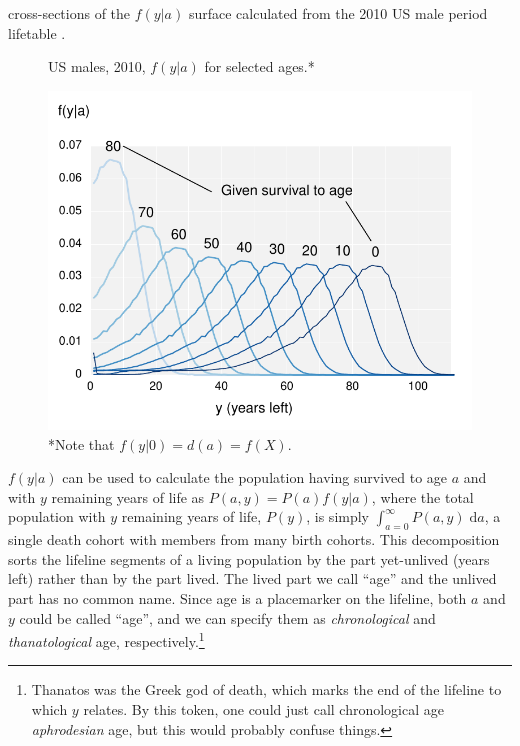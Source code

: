 \documentclass{article}
\newcommand{\dd}{\; \mathrm{d}}
\begin{document}
cross-sections of the $f(y|a)$ surface calculated from the 2010 US male period
lifetable .
\begin{figure}[h]
\centering
	\caption{US males, 2010, $f(y|a)$ for selected ages.*}
	\label{fig:fya}
	\includegraphics[scale=.8]{Figures/fya.pdf}	
	\caption*{*Note that $f(y|0) = d(a) = f(X)$.}
\end{figure}
$f(y|a)$ can be used to calculate the population having survived to age $a$ and
with $y$ remaining years of life as $P(a,y) = P(a)f(y|a)$, where the total
population with $y$ remaining years of life, $P(y)$, is simply $\int
_{a=0}^\infty P(a,y) \dd a$, a single death cohort with members from many birth
cohorts. This decomposition sorts the lifeline segments of a living population
by the part yet-unlived (years left) rather than by the part lived. The lived
part we call ``age'' and the unlived part has no common name. Since age is a
placemarker on the lifeline, both $a$ and $y$ could be called ``age'', and we
can specify them as \textit{chronological} and \textit{thanatological} age,
respectively.\footnote{Thanatos was the Greek god of death, which marks the end of the lifeline to which $y$ relates. By this token, one could just call chronological age \textit{aphrodesian} age, but this would probably confuse things.}
\end{document}
